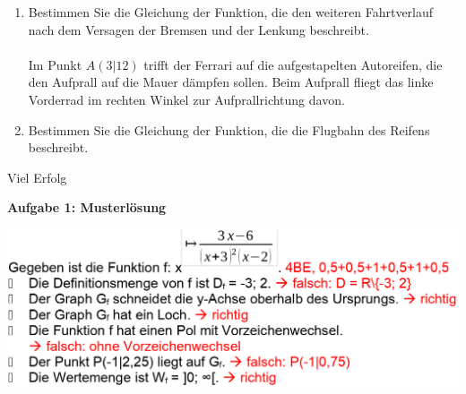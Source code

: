\documentclass[a4paper,12pt]{article}
\newcommand{\Aufgabe}[1]{
  {
  \vspace*{0.5cm}
  \textsf{\textbf{Aufgabe #1}}
  \vspace*{0.2cm}
  
  }
}
\begin{document}

\begin{enumerate}[label={\alph*)}]
  \item Bestimmen Sie die Gleichung der Funktion, die den weiteren Fahrtverlauf nach dem Versagen der Bremsen und der Lenkung beschreibt.\\
    \\
    Im Punkt $A(3|12)$ trifft der Ferrari auf die aufgestapelten Autoreifen, die den Aufprall auf die Mauer dämpfen sollen. Beim Aufprall fliegt das linke Vorderrad im rechten Winkel zur Aufprallrichtung davon.
  \item Bestimmen Sie die Gleichung der Funktion, die die Flugbahn des Reifens beschreibt.
\end{enumerate}

\vspace{3cm}

\centerline{Viel Erfolg}







\newpage
\Aufgabe{1: Musterlösung}
\includegraphics[width=\linewidth]{Q11_1KlausurJanuar2022_ml1.png}
\end{document}
